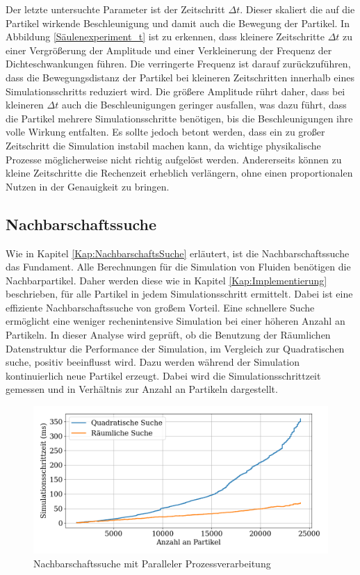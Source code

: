 \documentclass[a4paper, 12pt]{article}
\begin{document}
Der letzte untersuchte Parameter ist der Zeitschritt \(\Delta t\). Dieser skaliert die auf die Partikel wirkende Beschleunigung und damit auch die Bewegung der Partikel. In Abbildung \ref{Säulenexperiment_t} ist zu erkennen, dass kleinere Zeitschritte \(\Delta t\) zu einer Vergrößerung der Amplitude und einer Verkleinerung der Frequenz der Dichteschwankungen führen. Die verringerte Frequenz ist darauf zurückzuführen, dass die Bewegungsdistanz der Partikel bei kleineren Zeitschritten innerhalb eines Simulationsschritts reduziert wird. Die größere Amplitude rührt daher, dass bei kleineren \(\Delta t\) auch die Beschleunigungen geringer ausfallen, was dazu führt, dass die Partikel mehrere Simulationsschritte benötigen, bis die Beschleunigungen ihre volle Wirkung entfalten. Es sollte jedoch betont werden, dass ein zu großer Zeitschritt die Simulation instabil machen kann, da wichtige physikalische Prozesse möglicherweise nicht richtig aufgelöst werden. Andererseits können zu kleine Zeitschritte die Rechenzeit erheblich verlängern, ohne einen proportionalen Nutzen in der Genauigkeit zu bringen.

\subsection{Nachbarschaftssuche}

Wie in Kapitel \ref{Kap:NachbarschaftsSuche} erläutert, ist die Nachbarschaftssuche das Fundament. Alle Berechnungen für die Simulation von Fluiden benötigen die Nachbarpartikel. Daher werden diese wie in Kapitel \ref{Kap:Implementierung} beschrieben, für alle Partikel in jedem Simulationsschritt ermittelt. Dabei ist eine effiziente Nachbarschaftssuche von großem Vorteil. Eine schnellere Suche ermöglicht eine weniger rechenintensive Simulation bei einer höheren Anzahl an Partikeln. In dieser Analyse wird geprüft, ob die Benutzung der Räumlichen Datenstruktur die Performance der Simulation, im Vergleich zur Quadratischen suche, positiv beeinflusst wird. Dazu werden während der Simulation kontinuierlich neue Partikel erzeugt. Dabei wird die Simulationsschrittzeit gemessen und in Verhältnis zur Anzahl an Partikeln dargestellt.

\begin{figure}[H]
	\centering
	\includegraphics[width=.85\textwidth]{graphics/Nachbarschafts-Suche.png}
	\caption{Nachbarschaftssuche mit Paralleler Prozessverarbeitung}
	\label{NachbarschaftsSuche}
\end{figure}
\end{document}

